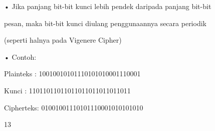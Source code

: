 \documentclass{article}
\begin{document}

• Jika panjang bit-bit kunci lebih pendek daripada panjang bit-bit 

pesan, maka bit-bit kunci diulang penggunaannya secara periodik 

(seperti halnya pada Vigenere Cipher)

• Contoh:


Plainteks   : 10010010101110101010001110001


Kunci         : 11011011011011011011011011011


Cipherteks: 01001001110101110001010101010 

13
\end{document}
